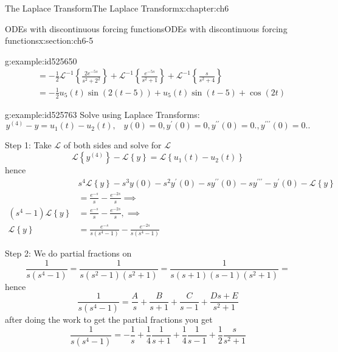 \documentclass[oneside,10pt,]{book}
\numberwithin{equation}{section}
\numberwithin{equation}{section}
\newcommand{\amp}{&}
\begin{document}
\begin{chapterptx}{The Laplace Transform}{}{The Laplace Transform}{}{}{x:chapter:ch6}
\begin{sectionptx}{ODEs with discontinuous forcing functions}{}{ODEs with discontinuous forcing functions}{}{}{x:section:ch6-5}
\begin{example}{}{g:example:id525650}
\begin{align*}
\amp =-\frac{1}{2}\mathcal{L}^{-1}\left\{ \frac{2e^{-5s}}{s^{2}+2^{2}}\right\} +\mathcal{L}^{-1}\left\{ \frac{e^{-5s}}{s^{2}+1}\right\} +\mathcal{L}^{-1}\left\{ \frac{s}{s^{2}+4}\right\} \\
\amp =-\frac{1}{2}u_{5}(t)\sin\left(2\left(t-5\right)\right)+u_{5}(t)\sin\left(t-5\right)+\cos\left(2t\right)
\end{align*}
%
\end{example}
\begin{example}{}{g:example:id525763}%
Solve using Laplace Transforms:%
\begin{equation*}
y^{(4)}-y=u_{1}(t)-u_{2}(t),\,\,\,\,\,y(0)=0,y^{\prime}(0)=0,y^{\prime\prime}(0)=0.,y^{\prime\prime\prime}(0)=0..
\end{equation*}
%
\par
Step 1: Take \(\mathcal{L}\) of both sides and solve for \(\mathcal{L}\)%
\begin{equation*}
\mathcal{L}\left\{ y^{(4)}\right\} -\mathcal{L}\left\{ y\right\} =\mathcal{L}\left\{ u_{1}(t)-u_{2}(t)\right\} 
\end{equation*}
hence%
\begin{align*}
\amp s^{4}\mathcal{L}\left\{ y\right\} -s^{3}y(0)-s^{2}y^{\prime}(0)-sy^{\prime\prime}(0)-sy^{\prime\prime\prime}-y^{\prime}(0)-\mathcal{L}\left\{ y\right\}\\
\amp =\frac{e^{-s}}{s}-\frac{e^{-2s}}{s}\implies\\
\left(s^{4}-1\right)\mathcal{L}\left\{ y\right\}  \amp =\frac{e^{-s}}{s}-\frac{e^{-2s}}{s},\implies\\
\mathcal{L}\left\{ y\right\}  \amp =\frac{e^{-s}}{s\left(s^{4}-1\right)}-\frac{e^{-2s}}{s\left(s^{4}-1\right)}
\end{align*}
%
\par
Step 2: We do partial fractions on%
\begin{equation*}
\frac{1}{s\left(s^{4}-1\right)}=\frac{1}{s\left(s^{2}-1\right)\left(s^{2}+1\right)}=\frac{1}{s\left(s+1\right)\left(s-1\right)\left(s^{2}+1\right)}=
\end{equation*}
hence%
\begin{equation*}
\frac{1}{s\left(s^{4}-1\right)}=\frac{A}{s}+\frac{B}{s+1}+\frac{C}{s-1}+\frac{Ds+E}{s^{2}+1}
\end{equation*}
after doing the work to get the partial fractions you get%
\begin{equation*}
\frac{1}{s\left(s^{4}-1\right)}=-\frac{1}{s}+\frac{1}{4}\frac{1}{s+1}+\frac{1}{4}\frac{1}{s-1}+\frac{1}{2}\frac{s}{s^{2}+1}
\end{equation*}

\end{example}
\end{sectionptx}
\end{chapterptx}
\end{document}
